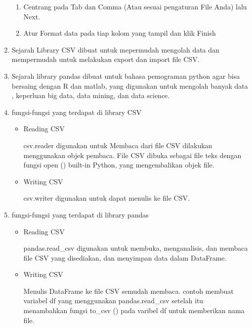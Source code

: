 \begin{enumerate}
\begin{enumerate}
        \item Centrang pada Tab dan Comma (Atau sesuai pengaturan File Anda) lalu Next.
        \item Atur Format data pada tiap kolom yang tampil dan klik Finish
    \end{enumerate}
    \item Sejarah Library CSV  dibuat untuk mepermudah mengolah data dan mempermudah untuk melakukan export dan import file CSV.
    \item Sejarah library pandas dibuat untuk bahasa pemograman python agar bisa bersaing dengan  R dan matlab, yang digunakan untuk mengolah banyak data , keperluan big data, data mining, dan data science.
    \item fungsi-fungsi yang terdapat di library CSV
    \begin{itemize}
        \item Reading CSV
        \par csv.reader digunakan untuk Membaca dari file CSV dilakukan menggunakan objek pembaca. File CSV dibuka sebagai file teks dengan fungsi open () built-in Python, yang mengembalikan objek file.
        \item Writing CSV
        \par csv.writer digunakan untuk dapat menulis ke file CSV.
    \end{itemize}
    \item fungsi-fungsi yang terdapat di library pandas
    \begin{itemize}
        \item Reading CSV
        \par pandas.read\_csv digunakan untuk membuka, menganalisis, dan membaca file CSV yang disediakan, dan menyimpan data dalam DataFrame.
        \item Writing CSV
        \par  Menulis DataFrame ke file CSV semudah membaca. contoh membuat variabel df yang menggunakan pandas.read\_csv setelah itu menambahkan fungsi to\_csv () pada varibel df untuk memberikan nama file.
    \end{itemize}
    
\end{enumerate}

